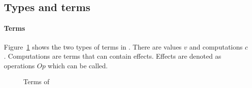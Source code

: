 \subsection{Types and terms}

\paragraph{Terms}
Figure~\ref{fig:terms:eff} shows the two types of terms in \eff. There are values $v$ and computations $c$. Computations are terms that can contain effects. Effects are denoted as operations $Op$ which can be called.

\begin{figure}[!htb]
\begin{center}
\end{center}
\caption{Terms of \eff}\label{fig:terms:eff}
\end{figure}

